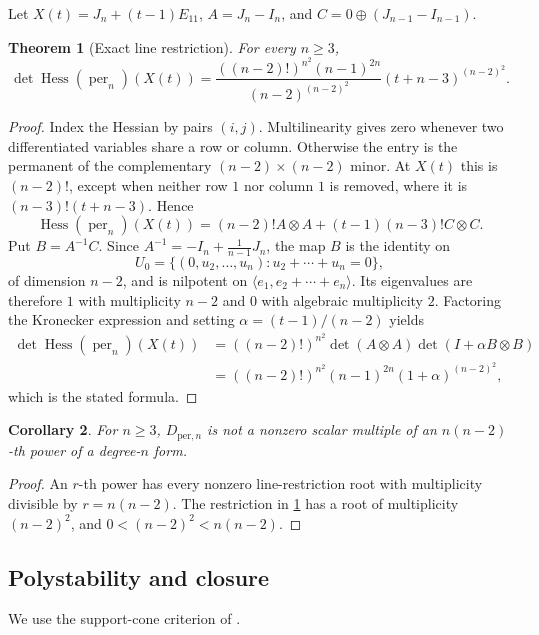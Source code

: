 \documentclass[11pt]{article}
\newtheorem{theorem}{Theorem}[section]
\newtheorem{corollary}[theorem]{Corollary}
\theoremstyle{definition}
\theoremstyle{remark}
\DeclareMathOperator{\Hess}{Hess}
\DeclareMathOperator{\per}{per}
\begin{document}
Let $X(t)=J_n+(t-1)E_{11}$, $A=J_n-I_n$, and
$C=0\oplus(J_{n-1}-I_{n-1})$.

\begin{theorem}[Exact line restriction]\label{thm:per-line}
For every $n\ge3$,
\[
\det\Hess(\per_n)(X(t))=
\frac{((n-2)!)^{n^2}(n-1)^{2n}}{(n-2)^{(n-2)^2}}
(t+n-3)^{(n-2)^2}.
\]
\end{theorem}
\begin{proof}
Index the Hessian by pairs $(i,j)$.  Multilinearity gives zero whenever two
differentiated variables share a row or column.  Otherwise the entry is the
permanent of the complementary $(n-2)\times(n-2)$ minor.  At $X(t)$ this is
$(n-2)!$, except when neither row $1$ nor column $1$ is removed, where it is
$(n-3)!(t+n-3)$.  Hence
\[
\Hess(\per_n)(X(t))=(n-2)!A\otimes A+(t-1)(n-3)!C\otimes C.
\]
Put $B=A^{-1}C$.  Since
$A^{-1}=-I_n+\frac1{n-1}J_n$, the map $B$ is the identity on
\[
U_0=\{(0,u_2,\dots,u_n):u_2+\cdots+u_n=0\},
\]
of dimension $n-2$, and is nilpotent on
$\langle e_1,e_2+\cdots+e_n\rangle$.  Its eigenvalues are therefore $1$ with
multiplicity $n-2$ and $0$ with algebraic multiplicity $2$.  Factoring the
Kronecker expression and setting $\alpha=(t-1)/(n-2)$ yields
\begin{align*}
\det\Hess(\per_n)(X(t))
&=((n-2)!)^{n^2}\det(A\otimes A)\det(I+\alpha B\otimes B)\\
&=((n-2)!)^{n^2}(n-1)^{2n}(1+\alpha)^{(n-2)^2},
\end{align*}
which is the stated formula.
\end{proof}

\begin{corollary}\label{cor:not-power}
For $n\ge3$, $D_{\mathrm{per},n}$ is not a nonzero scalar multiple of an
$n(n-2)$-th power of a degree-$n$ form.
\end{corollary}
\begin{proof}
An $r$-th power has every nonzero line-restriction root with multiplicity
divisible by $r=n(n-2)$.  The restriction in \cref{thm:per-line} has a root of
multiplicity $(n-2)^2$, and
$0<(n-2)^2<n(n-2)$.
\end{proof}

\subsection{Polystability and closure}

We use the support-cone criterion of
\cite[Proposition~2.8]{BI2017}.
\end{document}
